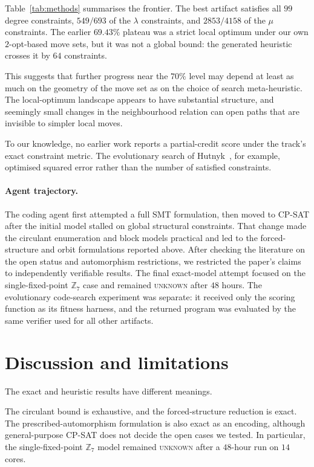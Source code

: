 \documentclass{article}
\begin{document}
Table~\ref{tab:methods} summarises the frontier. The best artifact satisfies
all $99$ degree constraints, $549/693$ of the $\lambda$ constraints, and
$2853/4158$ of the $\mu$ constraints. The earlier $69.43\%$ plateau was a
strict local optimum under our own $2$-opt-based move sets, but it was not a
global bound: the generated heuristic crosses it by $64$ constraints.

This suggests that further progress near the $70\%$ level may depend at least
as much on the geometry of the move set as on the choice of search
meta-heuristic. The local-optimum landscape appears to have substantial
structure, and seemingly small changes in the neighbourhood relation can open
paths that are invisible to simpler local moves.

To our knowledge, no earlier work reports a partial-credit score under the
track's exact constraint metric. The evolutionary search of
Hutnyk~\cite{hutnyk2019}, for example, optimised squared error rather than the
number of satisfied constraints.

\paragraph{Agent trajectory.}
The coding agent first attempted a full SMT formulation, then moved to CP-SAT
after the initial model stalled on global structural constraints. That change
made the circulant enumeration and block models practical and led to the
forced-structure and orbit formulations reported above. After checking the
literature on the open status and automorphism restrictions, we restricted the
paper's claims to independently verifiable results. The final exact-model
attempt focused on the single-fixed-point $\mathbb{Z}_7$ case and remained
\textsc{unknown} after $48$ hours. The evolutionary code-search experiment was
separate: it received only the scoring function as its fitness harness, and
the returned program was evaluated by the same verifier used for all other
artifacts.

\section{Discussion and limitations}
The exact and heuristic results have different meanings.

The circulant bound is exhaustive, and the forced-structure reduction is exact.
The prescribed-automorphism formulation is also exact as an encoding, although
general-purpose CP-SAT does not decide the open cases we tested. In particular,
the single-fixed-point $\mathbb{Z}_7$ model remained \textsc{unknown} after a
$48$-hour run on $14$ cores.
\end{document}
